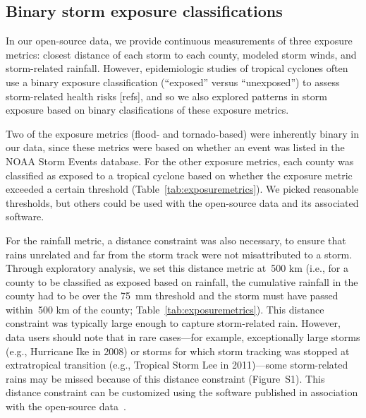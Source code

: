 \subsection*{Binary storm exposure classifications}

In our open-source data, we provide continuous measurements of three exposure
metrics: closest distance of each storm to each county, modeled storm winds,
and storm-related rainfall. However, epidemiologic studies of tropical cyclones
often use a binary exposure classification (``exposed'' versus ``unexposed'')
to assess storm-related health risks [refs], and so we also explored patterns
in storm exposure based on binary clasifications of these exposure metrics. 

Two of the exposure metrics (flood- and tornado-based) were inherently binary
in our data, since these metrics were based on whether an event was listed in
the NOAA Storm Events database.  For the other exposure metrics, each county
was classified as exposed to a tropical cyclone based on whether the exposure
metric exceeded a certain threshold (Table~\ref{tab:exposuremetrics}). We
picked reasonable thresholds, but others could be used with the open-source
data and its associated software. 

For the rainfall metric, a distance constraint was also necessary, to ensure
that rains unrelated and far from the storm track were not misattributed to a
storm. Through exploratory analysis, we set this distance metric at~500
\si{\kilo\metre} (i.e., for a county to be classified as exposed based on
rainfall, the cumulative rainfall in the county had to be over the
75~\si{\milli\metre} threshold and the storm must have passed within~500
\si{\kilo\metre} of the county; Table~\ref{tab:exposuremetrics}). This distance
constraint was typically large enough to capture storm-related rain.  However,
data users should note that in rare cases---for example, exceptionally large
storms (e.g., Hurricane Ike in 2008) or storms for which storm tracking was
stopped at extratropical transition (e.g., Tropical Storm Lee in 2011)---some
storm-related rains may be missed because of this distance constraint
(Figure~S1). This distance constraint can be customized using the software
published in association with the open-source
data~\parencite{hurricaneexposure}.

